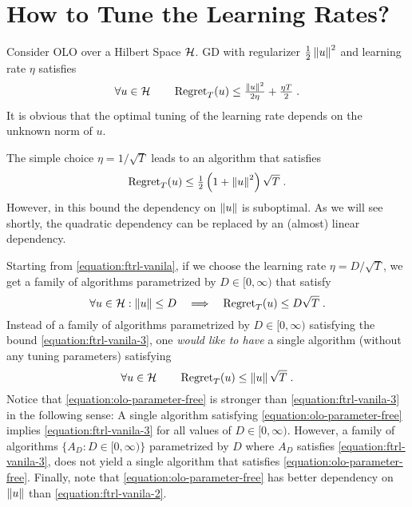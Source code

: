 \section{How to Tune the Learning Rates?}
\label{section:learning-rates}

Consider \ac{OLO} over a Hilbert Space $\mathcal{H}$. \ac{GD} with regularizer
$\tfrac{1}{2}\left\|{u}\right\|^2$ and learning rate $\eta$ satisfies~\citep{Shalev-Shwartz-2011}
\begin{equation}
\label{equation:ftrl-vanila}
\forall u \in \mathcal{H} \qquad \operatorname{Regret}_T(u) \le \tfrac{\left\|{u}\right\|^2}{2\eta} + \tfrac{\eta T}{2} \; .
\end{equation}
It is obvious that the optimal tuning of the learning rate depends on the
unknown norm of $u$.

The simple choice $\eta = 1/\sqrt{T}$ leads to an algorithm that satisfies
\begin{equation}
\label{equation:ftrl-vanila-2}
\operatorname{Regret}_T(u) \le \tfrac{1}{2}\left(1+\left\|{u}\right\|^2\right)\sqrt{T} \; .
\end{equation}
However, in this bound the dependency on $\left\|{u}\right\|$ is suboptimal. As we will
see shortly, the quadratic dependency can be replaced by an (almost) linear
dependency.

Starting from \eqref{equation:ftrl-vanila}, if we choose the learning rate $\eta =
D/\sqrt{T}$, we get a family of algorithms parametrized by $D \in [0,\infty)$
that satisfy
\begin{equation}
\label{equation:ftrl-vanila-3}
\forall u \in \mathcal{H} : \left\|{u}\right\| \le D \quad  \Longrightarrow \quad \operatorname{Regret}_T(u) \le D \sqrt{T} \; .
\end{equation}
Instead of a family of algorithms parametrized by $D \in [0,\infty)$ satisfying
the bound \eqref{equation:ftrl-vanila-3}, one \emph{would like
to have} a single algorithm (without any tuning parameters) satisfying
\begin{equation}
\label{equation:olo-parameter-free}
\forall u \in \mathcal{H} \qquad \operatorname{Regret}_T(u) \le \left\|{u}\right\| \sqrt{T} \; .
\end{equation}
Notice that \eqref{equation:olo-parameter-free} is stronger than
\eqref{equation:ftrl-vanila-3} in the following sense: A single algorithm
satisfying \eqref{equation:olo-parameter-free} implies
\eqref{equation:ftrl-vanila-3} for all values of $D \in [0,\infty)$. However,
a family of algorithms $\{A_D : D \in [0,\infty)\}$ parametrized by $D$ where
$A_D$ satisfies \eqref{equation:ftrl-vanila-3}, does not yield a single
algorithm that satisfies \eqref{equation:olo-parameter-free}.  Finally, note
that \eqref{equation:olo-parameter-free} has better dependency on $\left\|{u}\right\|$
than \eqref{equation:ftrl-vanila-2}.

